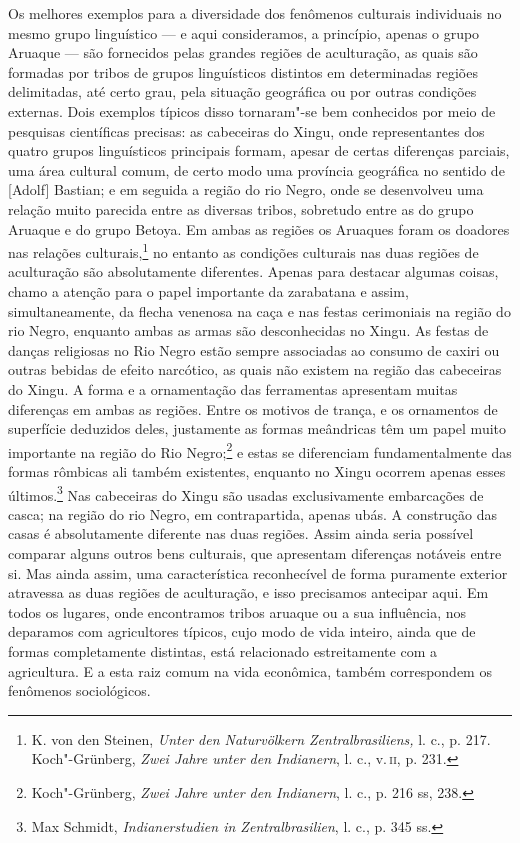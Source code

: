 Os melhores exemplos para a diversidade dos fenômenos culturais
individuais no mesmo grupo linguístico --- e aqui consideramos, a
princípio, apenas o grupo Aruaque --- são fornecidos pelas grandes
regiões de aculturação, as quais são formadas por tribos de grupos
linguísticos distintos em determinadas regiões delimitadas, até certo
grau, pela situação geográfica ou por outras condições externas. Dois
exemplos típicos disso tornaram"-se bem conhecidos por meio de pesquisas
científicas precisas: as cabeceiras do Xingu, onde representantes dos
quatro grupos linguísticos principais formam, apesar de certas
diferenças parciais, uma área cultural comum, de certo modo uma
província geográfica no sentido de {[}Adolf{]} Bastian; e em seguida a
região do rio Negro, onde se desenvolveu uma relação muito parecida
entre as diversas tribos, sobretudo entre as do grupo Aruaque e do grupo
Betoya. Em ambas as regiões os Aruaques foram os doadores nas relações
culturais,\footnote{K. von den Steinen, \emph{Unter den Naturvölkern
  Zentralbrasiliens,} l. c., p. 217. Koch"-Grünberg, \emph{Zwei Jahre
  unter den Indianern}, l. c., v.\,\textsc{ii}, p. 231.} no entanto as condições
culturais nas duas regiões de aculturação são absolutamente diferentes.
Apenas para destacar algumas coisas, chamo a atenção para o papel
importante da zarabatana e assim, simultaneamente, da flecha venenosa na
caça e nas festas cerimoniais na região do rio Negro, enquanto ambas as
armas são desconhecidas no Xingu. As festas de danças religiosas no Rio
Negro estão sempre associadas ao consumo de caxiri ou outras bebidas de
efeito narcótico, as quais não existem na região das cabeceiras do
Xingu. A forma e a ornamentação das ferramentas apresentam muitas
diferenças em ambas as regiões. Entre os motivos de trança, e os
ornamentos de superfície deduzidos deles, justamente as formas
meândricas têm um papel muito importante na região do Rio
Negro;\footnote{Koch"-Grünberg, \emph{Zwei Jahre unter den Indianern}, l.
  c., p. 216 ss, 238.} e estas se diferenciam fundamentalmente das
formas rômbicas ali também existentes, enquanto no Xingu ocorrem apenas
esses últimos.\footnote{Max Schmidt, \emph{Indianerstudien in
  Zentralbrasilien}, l. c., p. 345 ss.} Nas cabeceiras do Xingu são
usadas exclusivamente embarcações de casca; na região do rio Negro, em
contrapartida, apenas ubás. A construção das casas é absolutamente
diferente nas duas regiões. Assim ainda seria possível comparar alguns
outros bens culturais, que apresentam diferenças notáveis entre si. Mas
ainda assim, uma característica reconhecível de forma puramente exterior
atravessa as duas regiões de aculturação, e isso precisamos antecipar
aqui. Em todos os lugares, onde encontramos tribos aruaque ou a sua
influência, nos deparamos com agricultores típicos, cujo modo de vida
inteiro, ainda que de formas completamente distintas, está relacionado
estreitamente com a agricultura. E a esta raiz comum na vida econômica,
também correspondem os fenômenos sociológicos.

